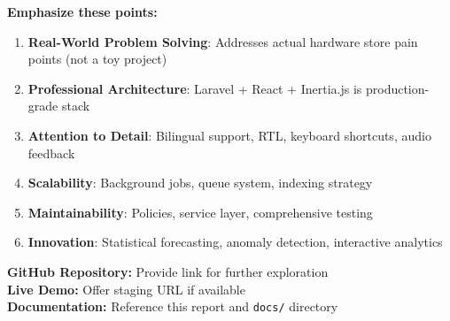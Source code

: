 \textbf{Emphasize these points:}

\begin{enumerate}
    \item \textbf{Real-World Problem Solving}: Addresses actual hardware store pain points (not a toy project)
    \item \textbf{Professional Architecture}: Laravel + React + Inertia.js is production-grade stack
    \item \textbf{Attention to Detail}: Bilingual support, RTL, keyboard shortcuts, audio feedback
    \item \textbf{Scalability}: Background jobs, queue system, indexing strategy
    \item \textbf{Maintainability}: Policies, service layer, comprehensive testing
    \item \textbf{Innovation}: Statistical forecasting, anomaly detection, interactive analytics
\end{enumerate}

\textbf{GitHub Repository:} Provide link for further exploration\\
\textbf{Live Demo:} Offer staging URL if available\\
\textbf{Documentation:} Reference this report and \texttt{docs/} directory
